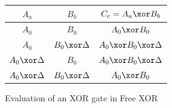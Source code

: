 \begin{figure}[ht]
    \centering
    \begin{minipage}[c][4cm][b]{0.6\linewidth}
        \centering

        \begin{tabular}{ccc}
            \toprule
            $A_a$ & $B_b$ & $C_c = A_a \xor B_b$\\
            \midrule
            $A_0$ & $B_0$ & $A_0\xor B_0$\\
            $A_0$ & $B_0 \xor \Delta$ & $A_0\xor B_0 \xor \Delta$\\
            $A_0 \xor \Delta$ & $B_0$ & $A_0\xor B_0 \xor \Delta$\\
            $A_0 \xor \Delta$ & $B_0 \xor \Delta$ & $A_0\xor B_0$\\
            \bottomrule
        \end{tabular}

        \vspace{0.4cm}
    \end{minipage}

    \caption{Evaluation of an XOR gate in Free XOR}
    \label{fig:freexortable}
\end{figure}